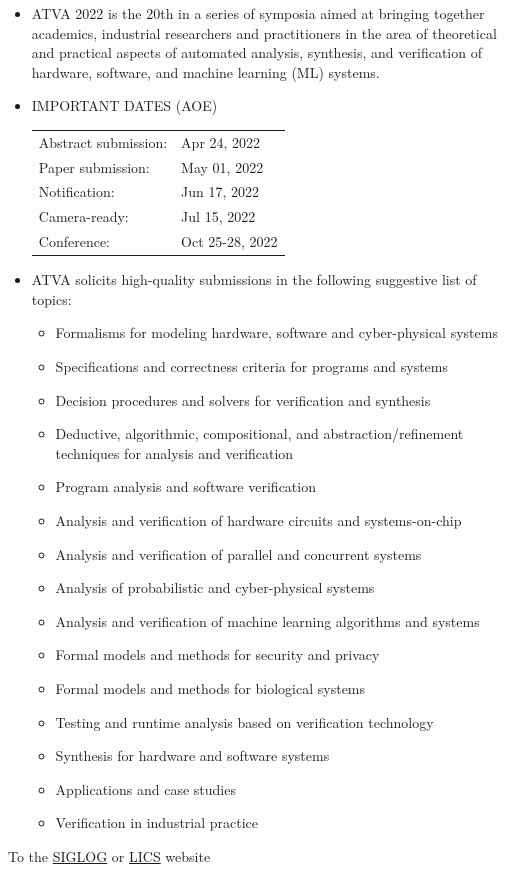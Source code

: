 \documentclass[prodmode,acmtecs]{acmsmall} %
\begin{document}
\begin{itemize}\item  ATVA 2022 is the 20th in a series of symposia aimed at bringing together academics, industrial researchers and practitioners in the area of theoretical and practical aspects of automated analysis, synthesis, and verification of hardware, software, and machine learning (ML) systems.  
 
\item  IMPORTANT DATES  (AOE) 
 
\begin{tabulary}{\linewidth}{LL}Abstract submission:  & Apr 24, 2022 \\
Paper submission:  & May 01, 2022 \\
Notification:  & Jun 17, 2022 \\
Camera-ready:  & Jul 15, 2022 \\
Conference:  & Oct 25-28, 2022 \\
\end{tabulary}
 
\item  ATVA solicits high-quality submissions in the following suggestive list of topics: 
 
\begin{itemize}\item  Formalisms for modeling hardware, software and cyber-physical systems
\item  Specifications and correctness criteria for programs and systems
\item  Decision procedures and solvers for verification and synthesis
\item  Deductive, algorithmic, compositional, and abstraction/refinement techniques for analysis and verification
\item  Program analysis and software verification
\item  Analysis and verification of hardware circuits and systems-on-chip 
\item  Analysis and verification of parallel and concurrent systems
\item  Analysis of probabilistic and cyber-physical systems
\item  Analysis and verification of machine learning algorithms and systems
\item  Formal models and methods for security and privacy
\item  Formal models and methods for biological systems
\item  Testing and runtime analysis based on verification technology
\item  Synthesis for hardware and software systems
\item  Applications and case studies
\item  Verification in industrial practice
\end{itemize} 
\end{itemize}


To the \href{http://siglog.org/}{SIGLOG} or \href{https://lics.siglog.org}{LICS} website
\end{document}
